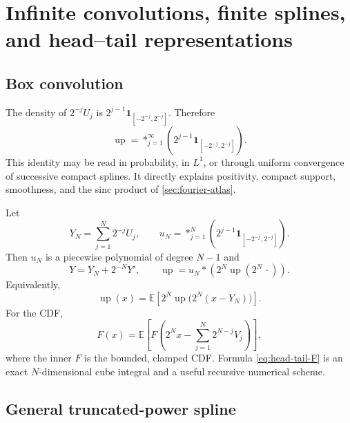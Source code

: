 \documentclass[11pt,oneside]{article}
\theoremstyle{definition}
\theoremstyle{remark}
\newcommand{\E}{\mathbb E}
\newcommand{\Up}{\operatorname{up}}
\begin{document}
\section{Infinite convolutions, finite splines, and head--tail representations}
\label{sec:convolution}

\subsection{Box convolution}

The density of $2^{-j}U_j$ is $2^{j-1}\mathbf1_{[-2^{-j},2^{-j}]}$.  Therefore
\begin{equation}
 \boxed{\quad
 \Up=\mathop{\ast}_{j=1}^{\infty}
 \left(2^{j-1}\mathbf1_{[-2^{-j},2^{-j}]}\right).
 \quad}                                                  \label{eq:infinite-box-convolution}
\end{equation}
This identity may be read in probability, in $L^1$, or through uniform convergence of
successive compact splines.  It directly explains positivity, compact support, smoothness,
and the sinc product of \cref{sec:fourier-atlas}.

Let
\begin{equation}
 Y_N=\sum_{j=1}^N2^{-j}U_j,
 \qquad
 u_N=\mathop{\ast}_{j=1}^{N}
 \left(2^{j-1}\mathbf1_{[-2^{-j},2^{-j}]}\right).        \label{eq:finite-box-spline}
\end{equation}
Then $u_N$ is a piecewise polynomial of degree $N-1$ and
\begin{equation}
 Y=Y_N+2^{-N}Y',
 \qquad
 \Up=u_N\ast\left(2^N\Up(2^N\,\cdot)\right).           \label{eq:head-tail-up}
\end{equation}
Equivalently,
\begin{equation}
 \Up(x)=\E\left[2^N\Up\bigl(2^N(x-Y_N)\bigr)\right].   \label{eq:head-tail-up-expectation}
\end{equation}
For the CDF,
\begin{equation}
 F(x)=\E\left[
 F\left(2^Nx-\sum_{j=1}^N2^{N-j}V_j\right)
 \right],                                                \label{eq:head-tail-F}
\end{equation}
where the inner $F$ is the bounded, clamped CDF.  Formula \eqref{eq:head-tail-F} is an exact
$N$-dimensional cube integral and a useful recursive numerical scheme.

\subsection{General truncated-power spline}
\end{document}
